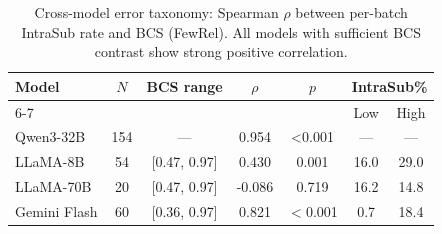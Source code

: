 \begin{table}[t]
\centering
\small
\caption{Cross-model error taxonomy: Spearman $\rho$ between per-batch IntraSub rate and BCS (FewRel). All models with sufficient BCS contrast show strong positive correlation.}
\label{tab:cross_model_error_taxonomy}
\begin{tabular}{lcccccc}
\toprule
Model & $N$ & BCS range & $\rho$ & $p$ & \multicolumn{2}{c}{IntraSub\%} \\
\cmidrule(lr){6-7}
 & & & & & Low & High \\
\midrule
Qwen3-32B & 154 & --- & 0.954 & <0.001 & --- & --- \\
LLaMA-8B & 54 & [0.47, 0.97] & 0.430 & 0.001 & 16.0 & 29.0 \\
LLaMA-70B & 20 & [0.47, 0.97] & -0.086 & 0.719 & 16.2 & 14.8 \\
Gemini Flash & 60 & [0.36, 0.97] & 0.821 & $<$0.001 & 0.7 & 18.4 \\
\bottomrule
\end{tabular}
\end{table}
